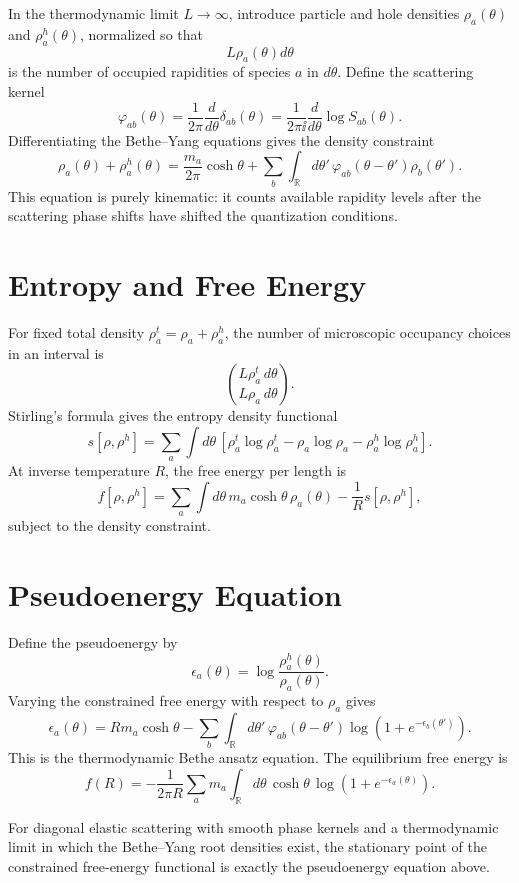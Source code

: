 In the thermodynamic limit \(L\to\infty\), introduce particle and hole
densities \(\rho_a(\theta)\) and \(\rho_a^h(\theta)\), normalized so that
\[
  L\rho_a(\theta)d\theta
\]
is the number of occupied rapidities of species \(a\) in \(d\theta\).  Define
the scattering kernel
\[
  \varphi_{ab}(\theta)
  =
  \frac{1}{2\pi}\frac{d}{d\theta}\delta_{ab}(\theta)
  =
  \frac{1}{2\pi\ii}\frac{d}{d\theta}\log S_{ab}(\theta).
\]
Differentiating the Bethe--Yang equations gives the density constraint
\[
  \rho_a(\theta)+\rho_a^h(\theta)
  =
  \frac{m_a}{2\pi}\cosh\theta
  +\sum_b\int_{\mathbb R}d\theta'\,
  \varphi_{ab}(\theta-\theta')\rho_b(\theta').
\]
This equation is purely kinematic: it counts available rapidity levels after
the scattering phase shifts have shifted the quantization conditions.

\section{Entropy and Free Energy}

For fixed total density \(\rho_a^t=\rho_a+\rho_a^h\), the number of
microscopic occupancy choices in an interval is
\[
  \binom{L\rho_a^t\,d\theta}{L\rho_a\,d\theta}.
\]
Stirling's formula gives the entropy density functional
\[
  s[\rho,\rho^h]
  =
  \sum_a\int d\theta\,
  \left[
  \rho_a^t\log\rho_a^t
  -\rho_a\log\rho_a
  -\rho_a^h\log\rho_a^h
  \right].
\]
At inverse temperature \(R\), the free energy per length is
\[
  f[\rho,\rho^h]
  =
  \sum_a\int d\theta\,m_a\cosh\theta\,\rho_a(\theta)
  -\frac1R s[\rho,\rho^h],
\]
subject to the density constraint.

\section{Pseudoenergy Equation}

Define the pseudoenergy by
\[
  \epsilon_a(\theta)=\log\frac{\rho_a^h(\theta)}{\rho_a(\theta)} .
\]
Varying the constrained free energy with respect to \(\rho_a\) gives
\[
  \epsilon_a(\theta)
  =
  Rm_a\cosh\theta
  -\sum_b\int_{\mathbb R}d\theta'\,
  \varphi_{ab}(\theta-\theta')
  \log\!\left(1+e^{-\epsilon_b(\theta')}\right).
\]
This is the thermodynamic Bethe ansatz equation.  The equilibrium free energy
is
\[
  f(R)
  =
  -\frac{1}{2\pi R}
  \sum_a m_a\int_{\mathbb R}d\theta\,
  \cosh\theta\,
  \log\!\left(1+e^{-\epsilon_a(\theta)}\right).
\]

\begin{proposition}
\label{prop:tba-variational-derivation}
For diagonal elastic scattering with smooth phase kernels and a thermodynamic
limit in which the Bethe--Yang root densities exist, the stationary point of
the constrained free-energy functional is exactly the pseudoenergy equation
above.
\end{proposition}

